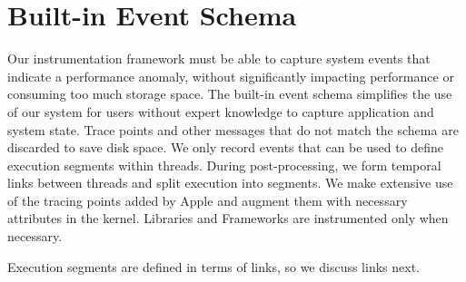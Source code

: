 \section{Built-in Event Schema}\label{section: builtin_event_schema}
Our instrumentation framework must be able to capture system events that indicate a performance anomaly, without significantly impacting performance or consuming too much storage space.
The built-in event schema simplifies the use of our system for users without expert knowledge to capture application and system state.
Trace points and other messages that do not match the schema are discarded to save disk space.
We only record events that can be used to define execution segments within threads.
During post-processing, we form temporal links between threads and split execution into segments.
We make extensive use of the tracing points added by Apple and augment them with necessary attributes in the kernel.
Libraries and Frameworks are instrumented only when necessary.

Execution segments are defined in terms of links, so we discuss links next.

